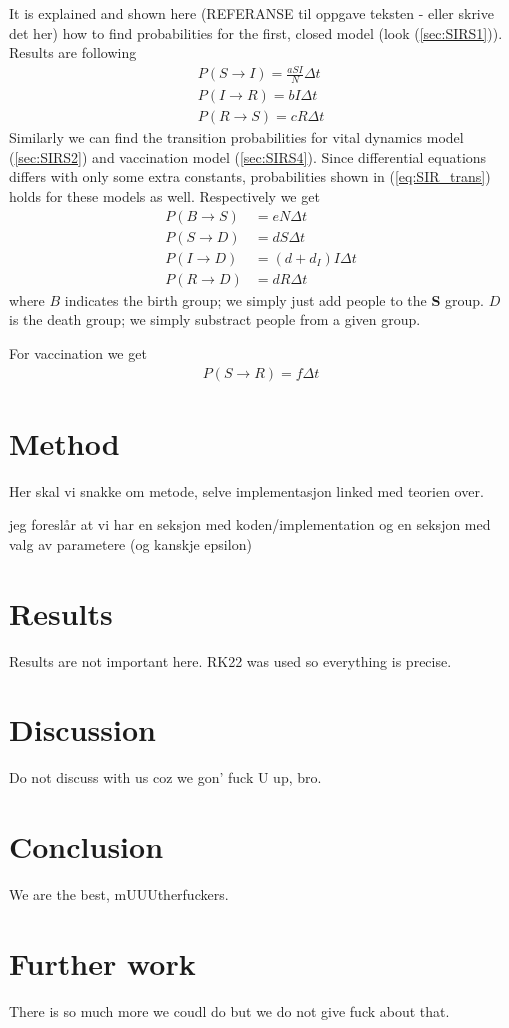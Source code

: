 \documentclass[a4paper, 10pt]{article}
\begin{document}
  It is explained and shown here (REFERANSE til oppgave teksten - eller skrive
  det her) how to find probabilities for the first, closed model (look
  (\ref{sec:SIRS1})). Results are following
  \begin{align*}\label{eq:SIR_trans}
	P(S \rightarrow I) = \frac{aSI}{N} \Delta t \\
    P(I \rightarrow R) = bI \Delta t \\
    P(R \rightarrow S) = cR \Delta t
  \end{align*}
  Similarly we can find the transition probabilities for vital dynamics model
  (\ref{sec:SIRS2}) and vaccination model (\ref{sec:SIRS4}). Since differential
  equations differs with only some extra constants, probabilities shown in
  (\ref{eq:SIR_trans}) holds for these models as well. Respectively we get
  \begin{align*}
	P(B \rightarrow S) &= eN \Delta t\\
    P(S \rightarrow D) &= dS \Delta t\\
    P(I \rightarrow D) &= (d + d_{I})I \Delta t\\
    P(R \rightarrow D) &= dR \Delta t
  \end{align*}
  where $B$ indicates the birth group; we simply just add people to the
  \textbf{S} group. $D$ is the death group; we simply substract people from a
  given group.

  For vaccination we get
  \begin{align*}
	P(S \rightarrow R) = f \Delta t
  \end{align*}

\section{Method}
Her skal vi snakke om metode, selve implementasjon linked med teorien over.

jeg foreslår at vi har en seksjon med koden/implementation og en seksjon med
valg av parametere (og kanskje epsilon)
\section{Results}
Results are not important here. RK22 was used so everything is precise.
\section{Discussion}
Do not discuss with us coz we gon' fuck U up, bro.
\section{Conclusion}
We are the best, mUUUtherfuckers.
\section{Further work}
There is so much more we coudl do but we do not give fuck about that.

\newpage
%
%
\end{document}
